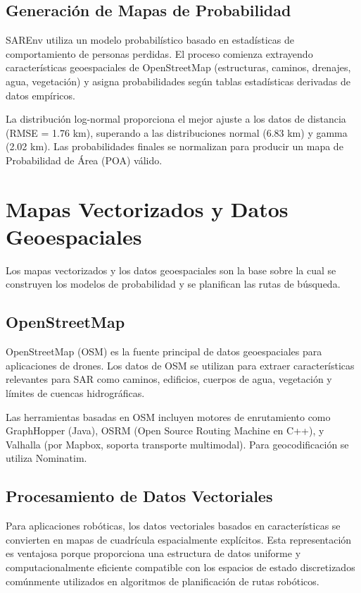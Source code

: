\documentclass[12pt]{report} %
\begin{document}
\section{Generación de Mapas de Probabilidad}

SAREnv\cite{grontved2025} utiliza un modelo probabilístico basado en estadísticas de comportamiento de personas perdidas. El proceso comienza extrayendo características geoespaciales de OpenStreetMap (estructuras, caminos, drenajes, agua, vegetación) y asigna probabilidades según tablas estadísticas derivadas de datos empíricos.

La distribución log-normal proporciona el mejor ajuste a los datos de distancia (RMSE = 1.76 km), superando a las distribuciones normal (6.83 km) y gamma (2.02 km). Las probabilidades finales se normalizan para producir un mapa de Probabilidad de Área (POA) válido\cite{doherty2014}.

\chapter{Mapas Vectorizados y Datos Geoespaciales}

Los mapas vectorizados y los datos geoespaciales son la base sobre la cual se construyen los modelos de probabilidad y se planifican las rutas de búsqueda.

\section{OpenStreetMap}

OpenStreetMap (OSM) es la fuente principal de datos geoespaciales para aplicaciones de drones. Los datos de OSM se utilizan para extraer características relevantes para SAR como caminos, edificios, cuerpos de agua, vegetación y límites de cuencas hidrográficas.

Las herramientas basadas en OSM incluyen motores de enrutamiento como GraphHopper (Java), OSRM (Open Source Routing Machine en C++), y Valhalla (por Mapbox, soporta transporte multimodal). Para geocodificación se utiliza Nominatim.

\section{Procesamiento de Datos Vectoriales}

Para aplicaciones robóticas, los datos vectoriales basados en características se convierten en mapas de cuadrícula espacialmente explícitos. Esta representación es ventajosa porque proporciona una estructura de datos uniforme y computacionalmente eficiente compatible con los espacios de estado discretizados comúnmente utilizados en algoritmos de planificación de rutas robóticos.
\end{document}
